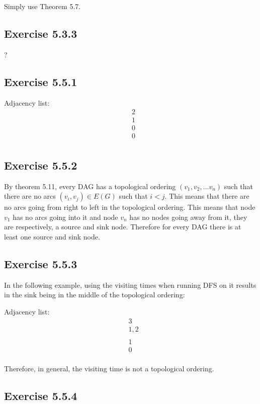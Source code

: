 \documentclass{article}
\begin{document}
Simply use Theorem 5.7.


\subsection*{Exercise 5.3.3}

?


\subsection*{Exercise 5.5.1}

Adjacency list:
\begin{align*}
&2 \\
&1 \\
&0 \\
&0 \\
\end{align*}


\subsection*{Exercise 5.5.2}

By theorem 5.11, every DAG has a topological ordering \((v_1,v_2,...v_n)\) such that there are no arcs \((v_i,v_j) \in E(G)\) such that \(i < j\). This means that there are no arcs going from right to left in the topological ordering. This means that node \(v_1\) has no arcs going into it and node \(v_n\) has no nodes going away from it, they are respectively, a source and sink node. Therefore for every DAG there is at least one source and sink node.


\subsection*{Exercise 5.5.3}

In the following example, using the visiting times when running DFS on it results in the sink being in the middle of the topological ordering:

Adjacency list:
\begin{align*}
&3 \\
&1,2 \\
& \\
&1 \\
&0 \\
\end{align*}

Therefore, in general, the visiting time is not a topological ordering.


\subsection*{Exercise 5.5.4}
\end{document}
